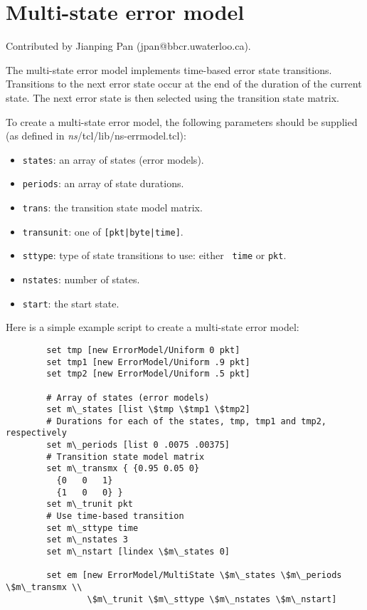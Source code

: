 \section{Multi-state error model}

Contributed by Jianping Pan (jpan@bbcr.uwaterloo.ca).

The multi-state error model implements time-based error state
transitions. Transitions to the next  
error state occur at the end of the duration of the current state. The
next error state is then selected using the 
transition state matrix.

To create a multi-state error model, the following parameters should
be supplied (as defined in \emph{ns}/tcl/lib/ns-errmodel.tcl): 
\begin{itemize}
\item {\tt states}: an array of states (error models).
\item {\tt periods}: an array of state durations.
\item {\tt trans}: the transition state model matrix.
\item {\tt transunit}: one of {\tt [pkt|byte|time]}.
\item {\tt sttype}: type of state transitions to use: either {\tt
    time} or {\tt pkt}.
\item {\tt nstates}: number of states.
\item {\tt start}: the start state.
\end{itemize}

Here is a simple example script to create a multi-state error model:
\begin{verbatim}
        set tmp [new ErrorModel/Uniform 0 pkt]
        set tmp1 [new ErrorModel/Uniform .9 pkt]
        set tmp2 [new ErrorModel/Uniform .5 pkt]

        # Array of states (error models)
        set m\_states [list \$tmp \$tmp1 \$tmp2]
        # Durations for each of the states, tmp, tmp1 and tmp2, respectively
        set m\_periods [list 0 .0075 .00375]
        # Transition state model matrix
        set m\_transmx { {0.95 0.05 0}
          {0   0   1}
          {1   0   0} }
        set m\_trunit pkt
        # Use time-based transition
        set m\_sttype time
        set m\_nstates 3
        set m\_nstart [lindex \$m\_states 0]

        set em [new ErrorModel/MultiState \$m\_states \$m\_periods \$m\_transmx \\
                \$m\_trunit \$m\_sttype \$m\_nstates \$m\_nstart]
\end{verbatim} %

